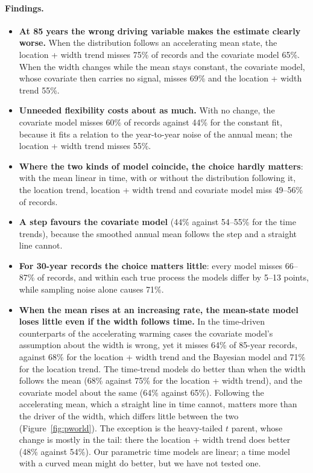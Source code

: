 \documentclass[11pt]{article}
\begin{document}
\paragraph{Findings.}
\begin{itemize}
\item \textbf{At 85 years the wrong driving variable makes the estimate clearly worse.} When the
  distribution follows an accelerating mean state, the location + width trend misses 75\% of
  records and the covariate model 65\%. When the width changes while the mean stays constant, the
  covariate model, whose covariate then carries no signal, misses 69\% and the location + width
  trend 55\%.
\item \textbf{Unneeded flexibility costs about as much.} With no change, the covariate model misses
  60\% of records against 44\% for the constant fit, because it fits a relation to the year-to-year
  noise of the annual mean; the location + width trend misses 55\%.
\item \textbf{Where the two kinds of model coincide, the choice hardly matters}: with the mean linear
  in time, with or without the distribution following it, the location trend, location + width
  trend and covariate model miss 49--56\% of records.
\item \textbf{A step favours the covariate model} (44\% against 54--55\% for the time trends),
  because the smoothed annual mean follows the step and a straight line cannot.
\item \textbf{For 30-year records the choice matters little}: every model misses 66--87\% of
  records, and within each true process the models differ by 5--13 points, while sampling noise
  alone causes 71\%.
\item \textbf{When the mean rises at an increasing rate, the mean-state model loses little even if the width follows
  time.} In the time-driven counterparts of the accelerating warming cases the covariate model's
  assumption about the width is wrong, yet it misses 64\% of 85-year records, against 68\% for the
  location + width trend and the Bayesian model and 71\% for the location trend. The time-trend
  models do better than when the width follows the mean (68\% against 75\% for the location + width
  trend), and the covariate model about the same (64\% against 65\%). Following the accelerating
  mean, which a straight line in time cannot, matters more than the driver of the width, which
  differs little between the two (Figure~\ref{fig:pworld}). The exception is the heavy-tailed $t$
  parent, whose change is mostly in the tail: there the location + width trend does better (48\%
  against 54\%). Our parametric time models are linear; a time model with a curved mean might do
  better, but we have not tested one.
\end{itemize}
\end{document}
